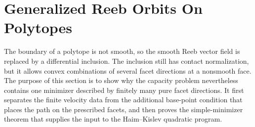 \section{Generalized Reeb Orbits On Polytopes}\label{sec:generalized-reeb-orbits-polytopes}

The boundary of a polytope is not smooth, so the smooth Reeb vector field is
replaced by a differential inclusion.  The inclusion still has contact
normalization, but it allows convex combinations of several facet directions
at a nonsmooth face.  The purpose of this section is to show why the capacity
problem nevertheless contains one minimizer described by finitely many pure
facet directions.  It first separates the finite velocity data from the
additional base-point condition that places the path on the prescribed
facets, and then proves the simple-minimizer theorem that supplies the input to
the Haim--Kislev quadratic program.




